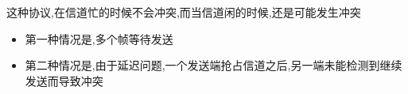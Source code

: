 \documentclass[UTF8,a4paper]{ctexart}
\begin{document}
这种协议,在信道忙的时候不会冲突,而当信道闲的时候,还是可能发生冲突
\begin{itemize}
  \item 第一种情况是,多个帧等待发送
  \item 第二种情况是,由于延迟问题,一个发送端抢占信道之后,另一端未能检测到继续发送而导致冲突
\end{itemize}
\end{document}
